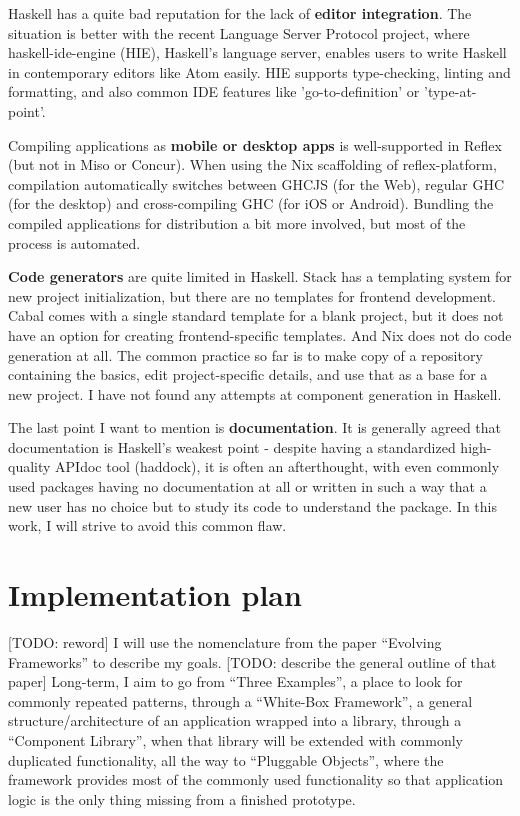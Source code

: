 \documentclass[english,odsaz]{fitthesis}
\begin{document}
Haskell has a quite bad reputation for the lack of \textbf{editor integration}. The
situation is better with the recent Language Server Protocol project,
where haskell-ide-engine (HIE), Haskell's language server, enables users to
write Haskell in contemporary editors like Atom easily. HIE supports
type-checking, linting and formatting, and also common IDE features like
'go-to-definition' or 'type-at-point'.

Compiling applications as \textbf{mobile or desktop apps} is well-supported in Reflex
(but not in Miso or Concur). When using the Nix scaffolding of reflex-platform,
compilation automatically switches between GHCJS (for the Web), regular GHC (for
the desktop) and cross-compiling GHC (for iOS or Android). Bundling the compiled
applications for distribution a bit more involved, but most of the process is
automated.

\textbf{Code generators} are quite limited in Haskell. Stack has a templating system for
new project initialization, but there are no templates for frontend development.
Cabal comes with a single standard template for a blank project, but it does not
have an option for creating frontend-specific templates. And Nix does not do
code generation at all. The common practice so far is to make copy of a
repository containing the basics, edit project-specific details, and use that as
a base for a new project. I have not found any attempts at component generation
in Haskell.

The last point I want to mention is \textbf{documentation}. It is generally agreed that
documentation is Haskell's weakest point - despite having a standardized
high-quality APIdoc tool (haddock), it is often an afterthought, with even
commonly used packages having no documentation at all or written in such a way
that a new user has no choice but to study its code to understand the
package. In this work, I will strive to avoid this common flaw.

\section{Implementation plan}
\label{sec:org1fad0c4}
[TODO: reword] I will use the nomenclature from the paper ``Evolving Frameworks''
\cite{roberts1996evolving} to describe my goals. [TODO: describe the general
outline of that paper] Long-term, I aim to go from ``Three Examples'', a place to
look for commonly repeated patterns, through a ``White-Box Framework'', a general
structure/architecture of an application wrapped into a library, through a
``Component Library'', when that library will be extended with commonly duplicated
functionality, all the way to ``Pluggable Objects'', where the framework provides
most of the commonly used functionality so that application logic is the only
thing missing from a finished prototype.
\end{document}
